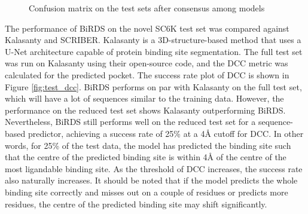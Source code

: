 \documentclass[journal=jcisd8,manuscript=article]{achemso}
\begin{document}
\begin{figure}%
    \centering
    \vspace{1em}
    \caption{\centering Confusion matrix on the test sets after consensus among models}%
    \label{fig:test_cm}%
\end{figure}

\newpage
The performance of BiRDS on the novel SC6K test set was compared against Kalasanty\cite{stepniewska2020improving} and SCRIBER\cite{zhang2019scriber}. Kalasanty is a 3D-structure-based method that uses a U-Net architecture\cite{ronneberger2015u} capable of protein binding site segmentation. The full test set was run on Kalasanty using their open-source code, and the DCC metric was calculated for the predicted pocket. The success rate plot of DCC is shown in Figure \ref{fig:test_dcc}. BiRDS performs on par with Kalasanty on the full test set, which will have a lot of sequences similar to the training data. However, the performance on the reduced test set shows Kalasanty outperforming BiRDS. Nevertheless, BiRDS still performs well on the reduced test set for a sequence-based predictor, achieving a success rate of 25\% at a 4{\AA} cutoff for DCC. In other words, for 25\% of the test data, the model has predicted the binding site such that the centre of the predicted binding site is within 4{\AA} of the centre of the most ligandable binding site. As the threshold of DCC increases, the success rate also naturally increases. It should be noted that if the model predicts the whole binding site correctly and misses out on a couple of residues or predicts more residues, the centre of the predicted binding site may shift significantly.
\end{document}
